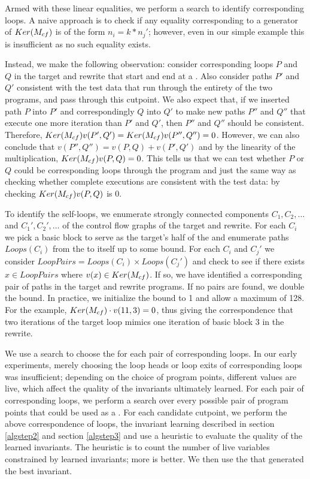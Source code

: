  Armed with these linear equalities, we perform a search to identify
corresponding loops. A naive approach is to check if any equality
corresponding to a generator of $Ker(M_{cf})$ is of
the form $n_i = k*n_j'$; however, even in our simple example this is
insufficient as no such equality exists.

Instead, we make the following observation: consider corresponding
loops $P$ and $Q$ in the target and rewrite that start and end
at a \cutpoint. Also consider paths $P'$ and $Q'$ consistent
with the test data that run through the entirety of the two
programs, and pass through this cutpoint. We also expect that, if
we inserted path $P$ into $P'$ and correspondingly $Q$ into $Q'$
to make new paths $P''$ and $Q''$ that execute one more iteration
than $P'$ and $Q'$, then $P''$ and $Q''$ should be consistent.
Therefore, $Ker(M_{cf}) v(P',Q') = Ker(M_{cf})
v(P'',Q'') = 0$. However, we can also conclude that $v(P'',Q'')
= v(P,Q) + v(P',Q')$ and by the linearity of the multiplication,
$Ker(M_{cf}) v(P,Q) = 0$. This tells us that we can test
whether $P$ or $Q$ could be corresponding loops through the program
and just the same way as checking whether complete executions are
consistent with the test data: by checking $Ker(M_{cf})
v(P,Q)$ is 0.

To identify the self-loops, we enumerate strongly connected components
$C_1, C_2, \dotsc$ and $C_1', C_2', \dotsc$ of the control flow graphs
of the target and rewrite. For each $C_i$ we pick a basic block to
serve as the target's half of the \cutpoint{} and enumerate paths
$Loops(C_i)$ from the \cutpoint{} to itself up to some bound. For
each $C_i$ and $C_j'$ we consider $LoopPairs = Loops(C_i) \times
Loops(C_j')$ and check to see if there exists $x \in LoopPairs$
where $v(x) \in Ker(M_{cf})$. If so, we have
identified a corresponding pair of paths in the target and rewrite
programs. If no pairs are found, we double the bound. In practice,
we initialize the bound to 1 and allow a maximum of 128. For the
example, $Ker(M_{cf})\cdot v(11,3) = 0$, thus giving the
correspondence that two iterations of the target loop mimics one
iteration of basic block 3 in the rewrite.

We use a search to choose the \cutpoint{} for each pair of
corresponding loops. In our early experiments, merely choosing the
loop heads or loop exits of corresponding loops was insufficient;
depending on the choice of program points, different values are live,
which affect the quality of the invariants ultimately learned. For
each pair of corresponding loops, we perform a search over every
possible pair of program points that could be used as a \cutpoint.
For each candidate cutpoint, we perform the above correspondence of
loops, the invariant learning described in section \ref{algstep2} and
section \ref{algstep3} and use a heuristic to evaluate the quality of
the learned invariants. The heuristic is to count the number of live
variables constrained by learned invariants; more is better. We then
use the \cutpoint{} that generated the best invariant.

